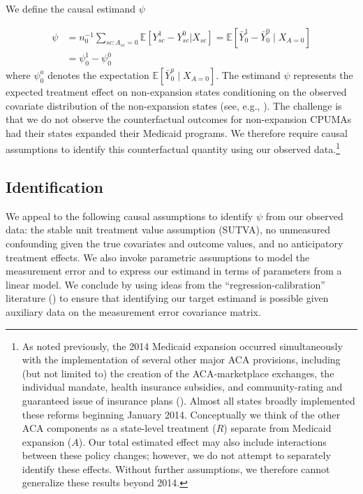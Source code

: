 \documentclass[aoas]{imsart}
\theoremstyle{plain}
\theoremstyle{remark}
\begin{document}
We define the causal estimand $\psi$

\begin{align} \label{eqn:psi}
    \psi &= n_0^{-1} \sum_{sc: A_{sc}=0} \mathbb{E}\left[ Y_{sc}^1 - Y_{sc}^0 | X_{sc}\right] = \mathbb{E}[\bar{Y}_0^1 - \bar{Y}_0^0 \mid X_{A=0}] \\ 
    &= \psi_0^1 - \psi_0^0
\end{align}
where $\psi_0^a$ denotes the expectation $\mathbb{E}[\bar{Y}_0^a \mid X_{A=0}]$. The estimand $\psi$ represents the expected treatment effect on non-expansion states conditioning on the observed covariate distribution of the non-expansion states (see, e.g., \cite{imbens2004nonparametric}). The challenge is that we do not observe the counterfactual outcomes for non-expansion CPUMAs had their states expanded their Medicaid programs. We therefore require causal assumptions to identify this counterfactual quantity using our observed data.\footnote{As noted previously, the 2014 Medicaid expansion occurred simultaneously with the implementation of several other major ACA provisions, including (but not limited to) the creation of the ACA-marketplace exchanges, the individual mandate, health insurance subsidies, and community-rating and guaranteed issue of insurance plans (\cite{courtemanche2017early}). Almost all states broadly implemented these reforms beginning January 2014. Conceptually we think of the other ACA components as a state-level treatment ($R$) separate from Medicaid expansion ($A$). Our total estimated effect may also include interactions between these policy changes; however, we do not attempt to separately identify these effects. Without further assumptions, we therefore cannot generalize these results beyond 2014.} 

\subsection{Identification} \label{ssec:identification}

We appeal to the following causal assumptions to identify $\psi$ from our observed data: the stable unit treatment value assumption (SUTVA), no unmeasured confounding given the true covariates and outcome values, and no anticipatory treatment effects. We also invoke parametric assumptions to model the measurement error and to express our estimand in terms of parameters from a linear model. We conclude by using ideas from the ``regression-calibration'' literature (\cite{gleser1992importance}) to ensure that identifying our target estimand is possible given auxiliary data on the measurement error covariance matrix.
\end{document}
